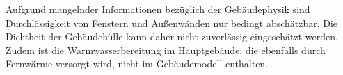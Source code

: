 Aufgrund mangelnder Informationen bezüglich der Gebäudephysik sind Durchlässigkeit von Fenstern und Außenwänden nur bedingt abschätzbar. Die Dichtheit der Gebäudehülle kann daher nicht zuverlässig eingeschätzt werden.\\
Zudem ist die Warmwasserbereitung im Hauptgebäude, die ebenfalls durch Fernwärme versorgt wird, nicht im Gebäudemodell enthalten. \\